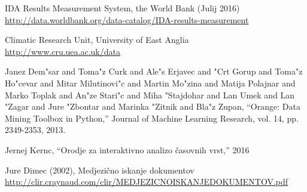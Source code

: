 \begin{thebibliography}{1}
 IDA Results Measurement System, the World Bank (Julij 2016)
\\ \url{http://data.worldbank.org/data-catalog/IDA-results-measurement}

 Climatic Research Unit, University of East Anglia
\\ \url{http://www.cru.uea.ac.uk/data}

 Janez Dem"sar and Toma"z Curk and Ale"s Erjavec and "Crt Gorup and Toma"z Ho"cevar and Mitar Milutinovi"c and Martin Mo"zina and Matija Polajnar and Marko Toplak and An"ze Stari"c and Miha "Stajdohar and Lan Umek and Lan "Zagar and Jure "Zbontar and Marinka "Zitnik and Bla"z Zupan, ``Orange: Data Mining Toolbox in Python,'' Journal of Machine Learning Research, vol. 14, pp. 2349-2353, 2013.


 Jernej Kernc, ``Orodje za interaktivno analizo časovnih vrst,'' 2016





 Jure Dimec (2002), Medjezično iskanje dokumentov 
\\ \url{http://clir.craynaud.com/clir/MEDJEZICNOISKANJEDOKUMENTOV.pdf}



\end{thebibliography}


